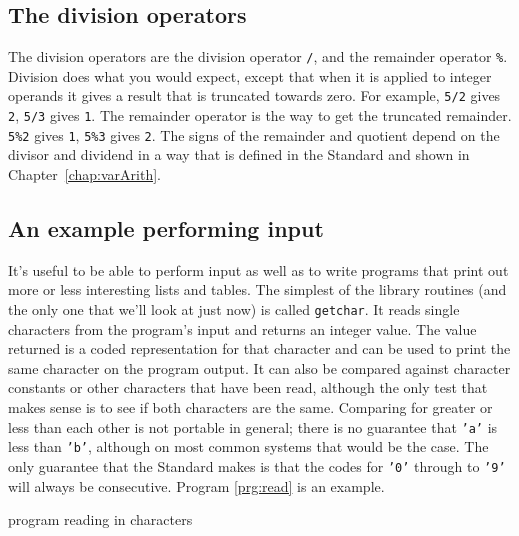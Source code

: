   

  \subsection{The division operators}
   

   
   The division operators are the division operator \texttt{/}, and the
    remainder operator \texttt{\%}. Division does what you would expect,
    except that when it is applied to integer operands it gives a result that
    is truncated towards zero. For example, \texttt{5/2} gives
    \texttt{2}, \texttt{5/3} gives \texttt{1}. The remainder
    operator is the way to get the truncated remainder. \texttt{5\%2} gives
    \texttt{1}, \texttt{5\%3} gives \texttt{2}. The signs of the
    remainder and quotient depend on the divisor and dividend in a way that is
    defined in the Standard and shown in Chapter~\ref{chap:varArith}.


  

  \subsection{An example performing input}
   

   It's useful to be able to perform input as well as to write programs
    that print out more or less interesting lists and tables. The simplest of
    the library routines (and the only one that we'll look at just now) is
    called \texttt{getchar}. It reads single characters from the program's
    input and returns an integer value. The value returned is a coded
    representation for that character and can be used to print the same
    character on the program output. It can also be compared against character
    constants or other characters that have been read, although the only test
    that makes sense is to see if both characters are the same. Comparing for
    greater or less than each other is not portable in general; there is no
    guarantee that \texttt{'a'} is less than \texttt{'b'}, although on
    most common systems that would be the case. The only guarantee that the
    Standard makes is that the codes for \texttt{'0'} through to
    \texttt{'9'} will always be consecutive.
    Program \ref{prg:read} is an example. 
    \begin{program}[phtb]
      \caption{\label{prg:read}program reading in characters}
    \end{program}
    
